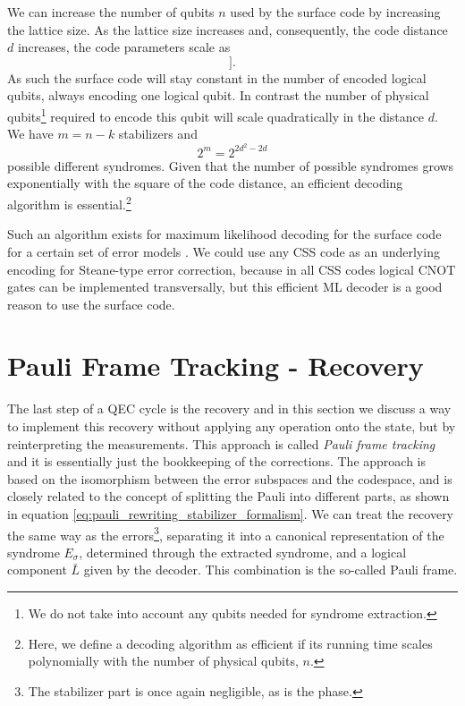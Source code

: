 We can increase the number of qubits $n$ used by the surface code by increasing the lattice size.
As the lattice size increases and, consequently, the code distance $d$ increases, the code parameters scale as
\begin{equation}
    [[n= d^2 + (d-1)^2, k=1, d]].
\end{equation}
As such the surface code will stay constant in the number of encoded logical qubits, always encoding one logical qubit.
In contrast the number of physical qubits\footnote{
    We do not take into account any qubits needed for syndrome extraction.
} required to encode this qubit will scale quadratically in the distance $d$.
We have $m=n-k$ stabilizers and 
\begin{equation}
   2^m = 2^{2d^2 - 2d} 
\end{equation}
possible different syndromes.
Given that the number of possible syndromes grows exponentially with the square of the code distance, an efficient decoding algorithm is essential.\footnote{
    Here, we define a decoding algorithm as efficient if its running time scales polynomially with the number of physical qubits, $n$.}

Such an algorithm exists for maximum likelihood decoding for the surface code for a certain set of error models \cite{efficient_decoding_algorithm}.
We could use any CSS code as an underlying encoding for Steane-type error correction, because in all CSS codes logical CNOT gates can be implemented transversally, 
but this efficient ML decoder is a good reason to use the surface code.


\section{Pauli Frame Tracking - Recovery}\label{sec:pauli_frame_tracking}

The last step of a QEC cycle is the recovery and in this section we discuss a way to implement this recovery without applying any operation onto the state, but by reinterpreting the measurements.
This approach is called \emph{Pauli frame tracking} \cite{pauli_frame_tracking_knill} and it is essentially just the bookkeeping of the corrections.
The approach is based on the isomorphism between the error subspaces and the codespace,
and is closely related to the concept of splitting the Pauli into different parts, as shown in equation \eqref{eq:pauli_rewriting_stabilizer_formalism}. 
We can treat the recovery the same way as the errors\footnote{The stabilizer part is once again negligible, as is the phase.}, separating it into a canonical representation of the syndrome $E_\sigma$, determined through the extracted syndrome, and a logical component $\bar{L}$ given by the decoder.
This combination is the so-called Pauli frame.


